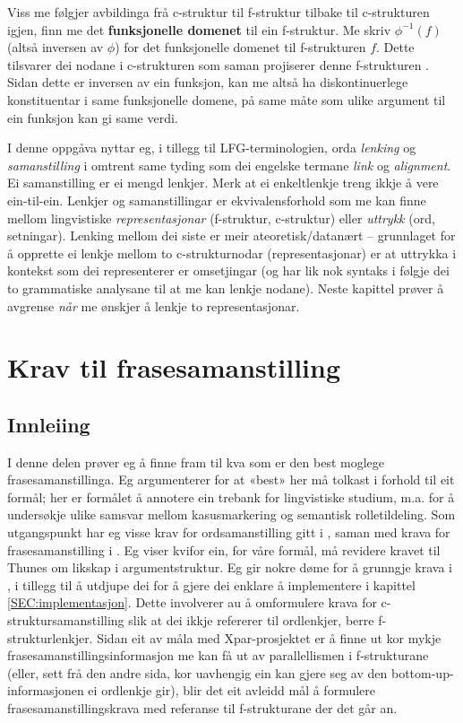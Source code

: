 \documentclass[12pt,a4paper,oneside,draft]{report}
\begin{document}
 Viss me følgjer avbildinga frå c\hyp{}struktur til f\hyp{}struktur tilbake til
 c\hyp{}strukturen igjen, finn me det \textbf{funksjonelle domenet} til ein
 f\hyp{}struktur. Me skriv $\phi^{-1}(f)$ (altså inversen av $\phi$) for
 det funksjonelle domenet til f\hyp{}strukturen $f$. Dette tilsvarer dei
 nodane i c\hyp{}strukturen som saman projiserer denne f\hyp{}strukturen
 \citep[s.~126]{bresnan2001lfs}. Sidan dette er inversen av ein
 funksjon, kan me altså ha diskontinuerlege konstituentar i same
 funksjonelle domene, på same måte som ulike argument til ein funksjon
 kan gi same verdi.

 I denne oppgåva nyttar eg, i tillegg til LFG-terminologien, orda
 \emph{lenking} og \emph{samanstilling} i omtrent same tyding som dei engelske
 termane \emph{link} og \emph{alignment}. Ei samanstilling er ei mengd
 lenkjer. Merk at ei enkeltlenkje treng ikkje å vere ein-til-ein.
 Lenkjer og samanstillingar er ekvivalensforhold som me kan finne
 mellom lingvistiske \emph{representasjonar} (f\hyp{}struktur, c\hyp{}struktur) eller
 \emph{uttrykk} (ord, setningar). Lenking mellom dei siste er meir
 ateoretisk/datanært -- grunnlaget for å opprette ei lenkje mellom to
 c\hyp{}strukturnodar (representasjonar) er at uttrykka i kontekst som dei
 representerer er omsetjingar (og har lik nok syntaks i følgje dei to
 grammatiske analysane til at me kan lenkje nodane). Neste kapittel
 prøver å avgrense \emph{når} me ønskjer å lenkje to representasjonar.


\chapter{Krav til frasesamanstilling}
\label{sec-3}

\label{SEC:ideell}

\section{Innleiing}
\label{sec-3.1}

I denne delen prøver eg å finne fram til kva som er den best moglege
 frasesamanstillinga. Eg argumenterer for at «best» her må tolkast i
 forhold til eit formål; her er formålet å annotere ein trebank for
 lingvistiske studium, m.a. for å undersøkje ulike samsvar mellom
 kasusmarkering og semantisk rolletildeling.  Som utgangspunkt har eg
 visse krav for ordsamanstilling gitt i \citet{thunes2003eal}, saman
 med krava for frasesamanstilling i \citet{dyvik2009lmp}. Eg viser
 kvifor ein, for våre formål, må revidere kravet til Thunes om likskap
 i argumentstruktur. Eg gir nokre døme for å grunngje krava i
 \citet{dyvik2009lmp}, i tillegg til å utdjupe dei for å gjere dei
 enklare å implementere i kapittel \ref{SEC:implementasjon}. Dette
 involverer au å omformulere krava for c\hyp{}struktursamanstilling slik at
 dei ikkje refererer til ordlenkjer, berre f\hyp{}strukturlenkjer. Sidan
 eit av måla med Xpar-prosjektet er å finne ut kor mykje
 frasesamanstillingsinformasjon me kan få ut av parallellismen i
 f\hyp{}strukturane (eller, sett frå den andre sida, kor uavhengig ein kan
 gjere seg av den bottom-up-informasjonen ei ordlenkje gir), blir det
 eit avleidd mål å formulere frasesamanstillingskrava med referanse
 til f\hyp{}strukturane der det går an.
\end{document}
